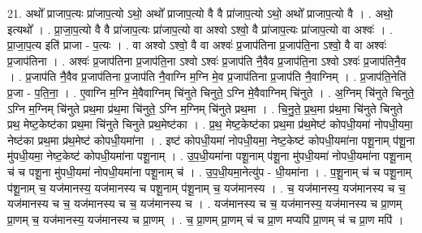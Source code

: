 \documentclass[17pt]{extarticle}
\begin{document}
21. अथो᳚ प्राजाप॒त्यः प्रा॑जाप॒त्यो ऽथो॒ अथो᳚ प्राजाप॒त्यो वै वै प्रा॑जाप॒त्यो ऽथो॒ अथो᳚ प्राजाप॒त्यो वै । . अथो॒ इत्यथो᳚ । . प्रा॒जा॒प॒त्यो वै वै प्रा॑जाप॒त्यः प्रा॑जाप॒त्यो वा अश्वो ऽश्वो॒ वै प्रा॑जाप॒त्यः प्रा॑जाप॒त्यो वा अश्वः॑ । . प्रा॒जा॒प॒त्य इति॑ प्राजा - प॒त्यः । . वा अश्वो ऽश्वो॒ वै वा अश्वः॑ प्र॒जाप॑तिना प्र॒जाप॑ति॒ना ऽश्वो॒ वै वा अश्वः॑ प्र॒जाप॑तिना । . अश्वः॑ प्र॒जाप॑तिना प्र॒जाप॑ति॒ना ऽश्वो ऽश्वः॑ प्र॒जाप॑ति नै॒वैव प्र॒जाप॑ति॒ना ऽश्वो ऽश्वः॑ प्र॒जाप॑तिनै॒व । . प्र॒जाप॑ति नै॒वैव प्र॒जाप॑तिना प्र॒जाप॑ति नै॒वाग्नि म॒ग्नि मे॒व प्र॒जाप॑तिना प्र॒जाप॑ति नै॒वाग्निम् । . प्र॒जाप॑ति॒नेति॑ प्र॒जा - प॒ति॒ना॒ । . ए॒वाग्नि म॒ग्नि मे॒वैवाग्निम् चि॑नुते चिनुते॒ ऽग्नि मे॒वैवाग्निम् चि॑नुते । . अ॒ग्निम् चि॑नुते चिनुते॒ ऽग्नि म॒ग्निम् चि॑नुते प्रथ॒मा प्र॑थ॒मा चि॑नुते॒ ऽग्नि म॒ग्निम् चि॑नुते प्रथ॒मा । . चि॒नु॒ते॒ प्र॒थ॒मा प्र॑थ॒मा चि॑नुते चिनुते प्रथ॒ मेष्ट॒केष्ट॑का प्रथ॒मा चि॑नुते चिनुते प्रथ॒मेष्ट॑का । . प्र॒थ॒ मेष्ट॒केष्ट॑का प्रथ॒मा प्र॑थ॒मेष्ट॑ कोपधी॒यमा॑ नोपधी॒यमा॒ नेष्ट॑का प्रथ॒मा प्र॑थ॒मेष्ट॑ कोपधी॒यमा॑ना । . इष्ट॑ कोपधी॒यमा॑ नोपधी॒यमा॒ नेष्ट॒केष्ट॑ कोपधी॒यमा॑ना पशू॒नाम् प॑शू॒ना मु॑पधी॒यमा॒ नेष्ट॒केष्ट॑ कोपधी॒यमा॑ना पशू॒नाम् । . उ॒प॒धी॒यमा॑ना पशू॒नाम् प॑शू॒ना मु॑पधी॒यमा॑ नोपधी॒यमा॑ना पशू॒नाम् च॑ च पशू॒ना मु॑पधी॒यमा॑ नोपधी॒यमा॑ना पशू॒नाम् च॑ । . उ॒प॒धी॒यमा॒नेत्यु॑प - धी॒यमा॑ना । . प॒शू॒नाम् च॑ च पशू॒नाम् प॑शू॒नाम् च॒ यज॑मानस्य॒ यज॑मानस्य च पशू॒नाम् प॑शू॒नाम् च॒ यज॑मानस्य । . च॒ यज॑मानस्य॒ यज॑मानस्य च च॒ यज॑मानस्य च च॒ यज॑मानस्य च च॒ यज॑मानस्य च । . यज॑मानस्य च च॒ यज॑मानस्य॒ यज॑मानस्य च प्रा॒णम् प्रा॒णम् च॒ यज॑मानस्य॒ यज॑मानस्य च प्रा॒णम् । . च॒ प्रा॒णम् प्रा॒णम् च॑ च प्रा॒ण मप्यपि॑ प्रा॒णम् च॑ च प्रा॒ण मपि॑ । \newline
\end{document}
